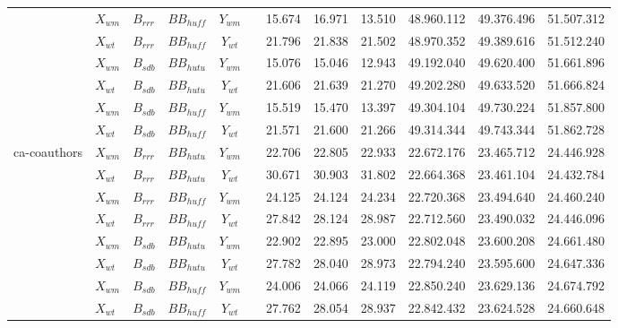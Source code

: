 \begin{table}
\begin{tabular}{l||l|l|l|l|c||r|r|r||r|r|r}
		& $X_{wm}$ & $B_{rrr}$ & $BB_{huff}$ & \multicolumn{1}{c}{$Y_{wm}$} & & 15.674 & 16.971 & 13.510 & 48.960.112 & 49.376.496 & 51.507.312 \\ 
		& $X_{wt}$ & $B_{rrr}$ & $BB_{huff}$ & \multicolumn{1}{c}{$Y_{wt}$} & & 21.796 & 21.838 & 21.502 & 48.970.352 & 49.389.616 & 51.512.240 \\ 
		& $X_{wm}$ & $B_{sdb}$ & $BB_{hutu}$ & \multicolumn{1}{c}{$Y_{wm}$} & & 15.076 & 15.046 & 12.943 & 49.192.040 & 49.620.400 & 51.661.896 \\ 
		& $X_{wt}$ & $B_{sdb}$ & $BB_{hutu}$ & \multicolumn{1}{c}{$Y_{wt}$} & & 21.606 & 21.639 & 21.270 & 49.202.280 & 49.633.520 & 51.666.824 \\ 
		& $X_{wm}$ & $B_{sdb}$ & $BB_{huff}$ & \multicolumn{1}{c}{$Y_{wm}$} & & 15.519 & 15.470 & 13.397 & 49.304.104 & 49.730.224 & 51.857.800 \\ 
		& $X_{wt}$ & $B_{sdb}$ & $BB_{huff}$ & \multicolumn{1}{c}{$Y_{wt}$} & & 21.571 & 21.600 & 21.266 & 49.314.344 & 49.743.344 & 51.862.728 \\ 
		\hline
		\multirow{8}{*}{ca-coauthors} & $X_{wm}$ & $B_{rrr}$ & $BB_{hutu}$ & \multicolumn{1}{c}{$Y_{wm}$} & & 22.706 & 22.805 & 22.933 & 22.672.176 & 23.465.712 & 24.446.928 \\
		& $X_{wt}$ & $B_{rrr}$ & $BB_{hutu}$ & \multicolumn{1}{c}{$Y_{wt}$} & & 30.671 & 30.903 & 31.802 & 22.664.368 & 23.461.104 & 24.432.784 \\ 
		& $X_{wm}$ & $B_{rrr}$ & $BB_{huff}$ & \multicolumn{1}{c}{$Y_{wm}$} & & 24.125 & 24.124 & 24.234 & 22.720.368 & 23.494.640 & 24.460.240 \\ 
		& $X_{wt}$ & $B_{rrr}$ & $BB_{huff}$ & \multicolumn{1}{c}{$Y_{wt}$} & & 27.842 & 28.124 & 28.987 & 22.712.560 & 23.490.032 & 24.446.096 \\ 
		& $X_{wm}$ & $B_{sdb}$ & $BB_{hutu}$ & \multicolumn{1}{c}{$Y_{wm}$} & & 22.902 & 22.895 & 23.000 & 22.802.048 & 23.600.208 & 24.661.480 \\ 
		& $X_{wt}$ & $B_{sdb}$ & $BB_{hutu}$ & \multicolumn{1}{c}{$Y_{wt}$} & & 27.782 & 28.040 & 28.973 & 22.794.240 & 23.595.600 & 24.647.336 \\ 
		& $X_{wm}$ & $B_{sdb}$ & $BB_{huff}$ & \multicolumn{1}{c}{$Y_{wm}$} & & 24.006 & 24.066 & 24.119 & 22.850.240 & 23.629.136 & 24.674.792 \\ 
		& $X_{wt}$ & $B_{sdb}$ & $BB_{huff}$ & \multicolumn{1}{c}{$Y_{wt}$} & & 27.762 & 28.054 & 28.937 & 22.842.432 & 23.624.528 & 24.660.648 \\ 
        \bottomrule
	\end{tabular}
\end{table}
